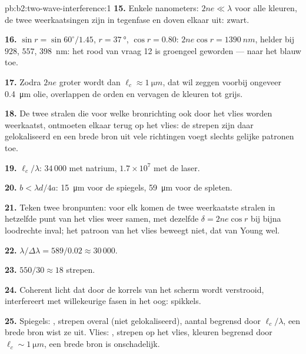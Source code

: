 \begin{solution}{pb:b2:two-wave-interference:1}
\textbf{15.} Enkele nanometers: $2ne \ll \lambda$ voor alle kleuren, de twee
weerkaatsingen zijn in tegenfase en doven elkaar uit: zwart.

\textbf{16.} $\sin r = \sin60^\circ/1.45$, $r = \qty{37}{\degree}$,
$\cos r = 0.80$: $2ne\cos r
= \qty{1390}{nm}$, helder bij $928$, $557$,
\qty{398}{nm}: het rood van vraag 12 is
groengeel geworden --- naar het blauw toe.

\textbf{17.} Zodra $2ne$ groter wordt dan
$\ell_c \approx \qty{1}{\micro m}$, dat wil zeggen voorbij ongeveer
\qty{0.4}{\micro m} olie, overlappen de orden en vervagen de kleuren tot grijs.

\textbf{18.} De twee stralen die voor welke bronrichting ook door het vlies
worden weerkaatst, ontmoeten elkaar terug op het vlies: de strepen zijn daar
gelokaliseerd en
een brede bron uit vele richtingen voegt slechts gelijke patronen toe.

\textbf{19.} $\ell_c/\lambda$: $34\,000$ met natrium, $1.7 \times 10^7$ met
de laser.

\textbf{20.} $b < \lambda d/4a$: \qty{15}{\micro m} voor de spiegels,
\qty{59}{\micro m} voor
de spleten.

\textbf{21.} Teken twee bronpunten: voor elk komen de twee weerkaatste stralen
in hetzelfde punt van het vlies weer samen, met dezelfde $\delta = 2ne\cos r$
bij bijna loodrechte inval; het patroon van het vlies beweegt niet, dat van Young
wel.

\textbf{22.} $\lambda/\Delta\lambda = 589/0.02 \approx 30\,000$.

\textbf{23.} $550/30 \approx 18$ strepen.

\textbf{24.} Coherent licht dat door de korrels van het scherm wordt
verstrooid, interfereert
met willekeurige fasen in het oog: spikkels.

\textbf{25.} Spiegels: , strepen overal
(niet gelokaliseerd), aantal begrensd door $\ell_c/\lambda$, een brede bron wist
ze uit. Vlies: , strepen op het vlies, kleuren
begrensd door $\ell_c \sim \qty{1}{\micro m}$, een brede bron is onschadelijk.
\end{solution}
